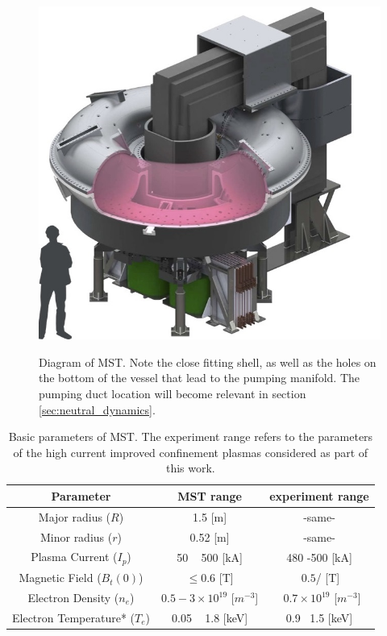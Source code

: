 \begin{figure}[!htb]
	\centering
	\includegraphics{./implementation/MST_model_diagram}
	\label{fig:MST_diagram}
	\caption[Diagram of MST]{Diagram of MST. Note the close fitting shell, as well as the holes on the bottom of the vessel that lead to the pumping manifold. The pumping duct location will become relevant in section \ref{sec:neutral_dynamics}.}
\end{figure}

\begin{table}[]
    \centering
    \begin{tabular}{||c|c|c||}
        Parameter & MST range & experiment range\\
        \hline
        Major radius ($R$)& 1.5 [m] & -same- \\
        Minor radius ($r$)& 0.52 [m] & -same- \\
        Plasma Current ($I_p$) & 50 ~ 500 [kA] & 480 -500 [kA] \\
        Magnetic Field ($B_t(0)$) & $\leq 0.6$ [T] & $~0.5$/ [T] \\
        Electron Density ($n_e$) & $0.5 - 3 \times 10^{19}$ [$m^{-3}$] & ~$0.7 \times 10^{19}$ [$m^{-3}$]\\
        Electron Temperature* ($T_e$) & 0.05 ~ 1.8 [keV] & 0.9 ~1.5 [keV] \\
        
    \end{tabular}
    \caption[MST parameters]{Basic parameters of MST. The experiment range refers to the parameters of the high current improved confinement plasmas considered as part of this work. }
    \label{tab:my_label}
\end{table}


